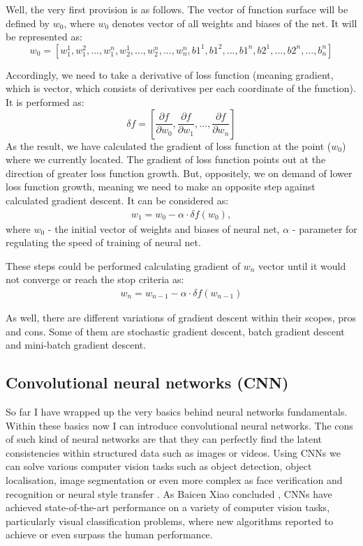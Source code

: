 Well, the very first provision is as follows. The vector of function surface will be defined by $w_0$, where $w_0$ denotes vector of all weights and biases of the net. It will be represented as: 
\[ w_0 = [w_1^1, w_1^2,...,w_1^n, w_2^1,...,w_2^n,...,w_n^n, b1^1, b1^2,...,b1^n, b2^1,...,b2^n,...,b_n^n] \]

Accordingly, we need to take a derivative of loss function (meaning gradient, which is vector, which consists of derivatives per each coordinate of the function). It is performed as:
\[ \delta{f} = \left[ \frac{\partial{f}}{\partial{w_0}}, \frac{\partial{f}}{\partial{w_1}}, ... ,\frac{\partial{f}}{\partial{w_n}} \right] \]
As the result, we have calculated the gradient of loss function at the point ($w_0$) where we currently located. The gradient of loss function points out at the direction of greater loss function growth. But, oppositely, we on demand of lower loss function growth, meaning we need to make an opposite step against calculated gradient descent. It can be considered as:
\begin{align*}
w_1 = w_0 - \alpha \cdot \delta{f(w_0)},
\end{align*}
where $w_0$ - the initial vector of weights and biases of neural net, $\alpha$ - parameter for regulating the speed of training of neural net. 

These steps could be performed calculating gradient of $w_n$ vector until it would not converge or reach the stop criteria as:
\begin{align*}
w_n = w_{n-1} - \alpha \cdot \delta{f(w_{n-1})}
\end{align*}

As well, there are different variations of gradient descent within their scopes, pros and cons. Some of them are stochastic gradient descent, batch gradient descent and mini-batch gradient descent. 

\subsection{Convolutional neural networks (CNN)}
So far I have wrapped up the very basics behind neural networks fundamentals. Within these basics now I can introduce convolutional neural networks. The cons of such kind of neural networks are that they can perfectly find the latent consistencies within structured data such as images or videos. Using CNNs we can solve various computer vision tasks such as object detection, object localisation, image segmentation or even more complex as face verification and recognition or neural style transfer \cite{Jing2020}. As Baicen Xiao concluded \cite{Hosseini2017}, CNNs have
achieved state-of-the-art performance on a variety of computer vision tasks, particularly visual classification problems, where new algorithms reported to achieve or even surpass the human performance.  

